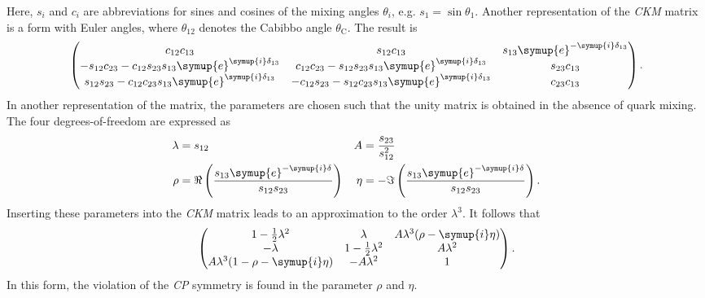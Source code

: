Here, $s_i$ and $c_i$ are abbreviations for sines and cosines of the mixing angles $\theta_i$, e.g. $s_1=\sin\theta_1$. 
Another representation of the \textit{CKM} matrix is a form with Euler angles, where $\theta_12$ denotes the Cabibbo angle $\theta_{\mathrm{C}}$.
The result is
\begin{align*}
    \begin{pmatrix}
        c_{12}c_{13} & s_{12}c_{13} & s_{13}\symup{e}^{-\symup{i}\delta_{13}} \\
        -s_{12}c_{23} - c_{12}s_{23}s_{13}\symup{e}^{\symup{i}\delta_{13}} & c_{12}c_{23} - s_{12}s_{23}s_{13}\symup{e}^{\symup{i}\delta_{13}} & s_{23}c_{13} \\
        s_{12}s_{23} - c_{12}c_{23}s_{13}\symup{e}^{\symup{i}\delta_{13}} & -c_{12}s_{23} - s_{12}c_{23}s_{13}\symup{e}^{\symup{i}\delta_{13}} & c_{23}c_{13} \\
    \end{pmatrix}.
\end{align*}
In another representation of the matrix, the parameters are chosen such that the unity matrix is obtained in the absence of quark mixing. The four degrees-of-freedom
are expressed as 
\begin{align*}
    \lambda & = s_{12} & A &= \frac{s_{23}}{s_{12}^2} \\
    \rho &= \Re\left(\frac{s_{13}\symup{e}^{-\symup{i}\delta}}{s_{12}s_{23}}\right) & \eta&=-\Im\left(\frac{s_{13}\symup{e}^{-\symup{i}\delta}}{s_{12}s_{23}}\right). \\
\end{align*}
Inserting these parameters into the \textit{CKM} matrix leads to an approximation to the order $\lambda^3$. It follows that
\begin{align*}
    \begin{pmatrix}
        1-\frac{1}{2}\lambda^2 & \lambda & A\lambda^3(\rho-\symup{i}\eta) \\
        -\lambda & 1-\frac{1}{2}\lambda^2 & A\lambda^2 \\
        A\lambda^3(1-\rho-\symup{i}\eta) & -A\lambda^2 & 1 \\
    \end{pmatrix}.
\end{align*}
In this form, the violation of the \textit{CP} symmetry is found in the parameter $\rho$ and $\eta$.

